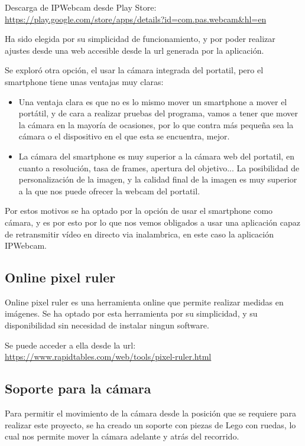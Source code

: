 Descarga de IPWebcam desde Play Store: \url{https://play.google.com/store/apps/details?id=com.pas.webcam&hl=en}

Ha sido elegida por su simplicidad de funcionamiento, y por poder realizar ajustes desde una web accesible desde la url generada por la aplicación.

Se exploró otra opción, el usar la cámara integrada del portatil, pero el smartphone tiene unas ventajas muy claras:

\begin{itemize}
	
	\item Una ventaja clara es que no es lo mismo mover un smartphone a mover el portátil, y de cara a realizar pruebas del programa, vamos a tener que mover la cámara en la mayoría de ocasiones, por lo que contra más pequeña sea la cámara o el dispositivo en el que esta se encuentra, mejor.
	
	\item La cámara del smartphone es muy superior a la cámara web del portatil, en cuanto a resolución, tasa de frames, apertura del objetivo... La posibilidad de personalización de la imagen, y la calidad final de la imagen es muy superior a la que nos puede ofrecer la webcam del portatil.
	
\end{itemize}

Por estos motivos se ha optado por la opción de usar el smartphone como cámara, y es por esto por lo que nos vemos obligados a usar una aplicación capaz de retransmitir vídeo en directo via inalambrica, en este caso la aplicación IPWebcam.

\subsection{Online pixel ruler}
Online pixel ruler es una herramienta online que permite realizar medidas en imágenes. Se ha optado por esta herramienta por su simplicidad, y su disponibilidad sin necesidad de instalar ningun software. 

Se puede acceder a ella desde la url: \url{https://www.rapidtables.com/web/tools/pixel-ruler.html}


\subsection{Soporte para la cámara}
Para permitir el movimiento de la cámara desde la posición que se requiere para realizar este proyecto, se ha creado un soporte con piezas de Lego con ruedas, lo cual nos permite mover la cámara adelante y atrás del recorrido.
 
